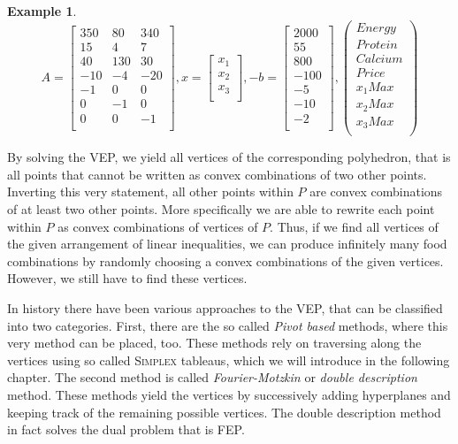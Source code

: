 \documentclass[a4paper, 11pt]{article}
\newtheorem{example}{Example}
\begin{document}
\begin{example}
		\begin{equation*}
		A = \begin{bmatrix}
			350&80&340\\
			15&4&7\\
			40&130&30\\
			-10&-4&-20\\
			-1&0&0\\
			0&-1&0\\
			0&0&-1\\
		\end{bmatrix},
		x = \begin{bmatrix}
			x_1\\x_2\\x_3\\
		\end{bmatrix},
		-b = \begin{bmatrix}
			2000\\
			55\\
			800\\
			-100\\
			-5\\
			-10\\
			-2\\
		\end{bmatrix},
		\begin{pmatrix}
			Energy\\
			Protein\\
			Calcium\\
			Price\\
			x_1Max\\
			x_2Max\\
			x_3Max\\
		\end{pmatrix}
	\end{equation*}
\end{example}

By solving the VEP, we yield all vertices of the corresponding polyhedron, that is all points that cannot be written as convex combinations of two other points. Inverting this very statement, all other points within $P$ are convex combinations of at least two other points. More specifically we are able to rewrite each point within $P$ as convex combinations of vertices of $P$. Thus, if we find all vertices of the given arrangement of linear inequalities, we can produce infinitely many food combinations by randomly choosing a convex combinations of the given vertices. However, we still have to find these vertices.\medskip

In history there have been various approaches to the VEP, that can be classified into two categories. First, there are the so called \textit{Pivot based} methods, where this very method can be placed, too. These methods rely on traversing along the vertices using so called \textsc{Simplex} tableaus, which we will introduce in the following chapter. The second method is called \textit{Fourier-Motzkin} or \textit{double description} method\cite{Motzkin}. These methods yield the vertices by successively adding hyperplanes and keeping track of the remaining possible vertices. The double description method in fact solves the dual problem that is FEP. 
\end{document}
